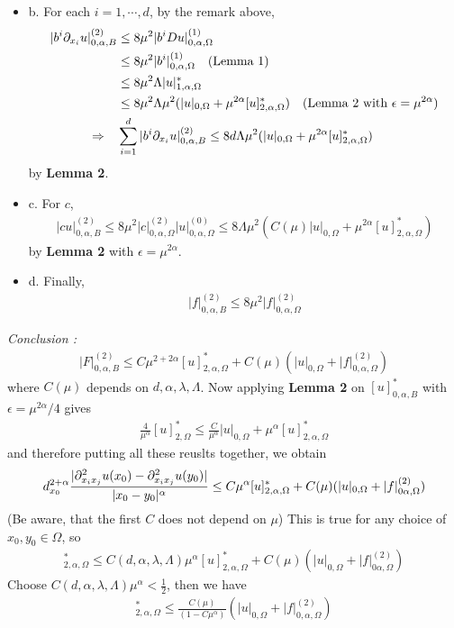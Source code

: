 \documentclass[12pt,a4paper]{article}
\newenvironment{proof}
{\begin{changemargin}{1cm}{0.5cm} 
	}%
	{\end{changemargin}
}
\renewenvironment{i}
{\begin{itemize} 
	}%
	{\end{itemize}
}
\newenvironment{p}
{\begin{proof} 
	}%
	{\end{proof}
}
\begin{document}
\begin{p}
\begin{i}
\item[b.] For each $i=1, \cdots, d$, by the remark above,
\begin{align*}
|b^i \partial_{x_i}u |^{(2)}_{0, \alpha, B} & \leq 8\mu^2 |b^iDu|_{0, \alpha, \Omega}^{(1)} \\
&\leq 8\mu^2 |b^i|^{(1)}_{0, \alpha, \Omega} \quad \text{(Lemma 1)}\\
&\leq 8\mu^2 \Lambda |u|^*_{1, \alpha, \Omega} \\
&\leq 8\mu^2 \Lambda \mu^2 (|u|_{0, \Omega} + \mu^{2\alpha}[u]^*_{2, \alpha, \Omega}) \quad \text{(Lemma 2 with } \epsilon = \mu^{2\alpha}) \\
\Rightarrow \quad &\sum_{i=1}^d |b^i \partial_{x_i}u |^{(2)}_{0, \alpha, B} \leq 8d\Lambda \mu^2 (|u|_{0, \Omega} + \mu^{2\alpha}[u]^*_{2, \alpha, \Omega})
\end{align*}
by \textbf{Lemma 2}.
\item[c.] For $c$,
\begin{align*}
|cu|^{(2)}_{0, \alpha, B}\leq 8\mu^2 |c|^{(2)}_{0, \alpha, \Omega} |u|^{(0)}_{0, \alpha, \Omega} \leq 8\Lambda \mu^2 (C(\mu) |u|_{0, \Omega} + \mu^{2\alpha} [u]^*_{2, \alpha, \Omega})
\end{align*}
by \textbf{Lemma 2} with $\epsilon = \mu^{2\alpha}$.
\item[d.] Finally,
\begin{align*}
|f|^{(2)}_{0, \alpha, B} \leq 8\mu^2 |f|^{(2)}_{0, \alpha, \Omega}
\end{align*}
\end{i}
\emph{Conclusion :} 
\begin{align*}
|F|^{(2)}_{0, \alpha, B} \leq C \mu^{2+ 2\alpha} [u]^*_{2, \alpha, \Omega} + C(\mu)(|u|_{0, \Omega}+|f|^{(2)}_{0, \alpha, \Omega})
\end{align*}
where $C(\mu)$ depends on $d, \alpha, \lambda, \Lambda$. Now applying \textbf{Lemma 2} on $[u]^*_{0, \alpha,B}$ with $\epsilon = \mu^{2\alpha}/4$ gives
\begin{align*}
\frac{4}{\mu^{\alpha}} [u]^*_{2, \Omega} \leq \frac{C}{\mu^{\alpha}}|u|_{0, \Omega} + \mu^{\alpha}[u]^*_{2, \alpha, \Omega} 
\end{align*}
and therefore putting all these reuslts together, we obtain
\begin{align*}
d^{2+ \alpha}_{x_0} \frac{|\partial^2_{x_i x_j} u(x_0) - \partial^2_{x_i x_j} u(y_0)|}{|x_0 - y_0|^{\alpha}} \leq  C\mu^{\alpha} [u]^*_{2, \alpha, \Omega} + C(\mu) (|u|_{0, \Omega} + |f|^{(2)}_{0 \alpha, \Omega})
\end{align*}
(Be aware, that the first $C$ does not depend on $\mu$) This is true for any choice of $x_0, y_0 \in \Omega$, so
\begin{align*}
[u]^*_{2, \alpha, \Omega} \leq C(d, \alpha, \lambda, \Lambda)\mu^{\alpha} [u]^*_{2, \alpha, \Omega} + C(\mu) (|u|_{0, \Omega} + |f|^{(2)}_{0 \alpha, \Omega})
\end{align*}
Choose $C(d, \alpha, \lambda, \Lambda) \mu^{\alpha} < \frac{1}{2}$, then we have
\begin{align*}
[u]^*_{2, \alpha, \Omega} \leq \frac{C(\mu)}{(1- C\mu^{\alpha})}(|u|_{0, \Omega} + |f|^{(2)}_{0, \alpha, \Omega})
\end{align*}
\eop
\end{p}
\s
\end{document}
